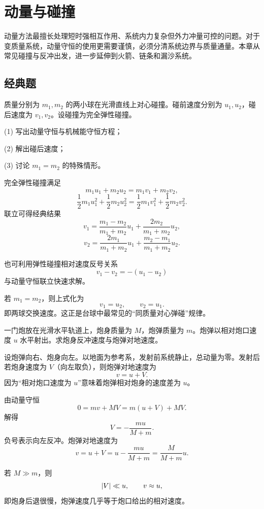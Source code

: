 \chapter{动量与碰撞}

动量方法最擅长处理短时强相互作用、系统内力复杂但外力冲量可控的问题。对于变质量系统，动量守恒的使用更需要谨慎，必须分清系统边界与质量通量。本章从常见碰撞与反冲出发，进一步延伸到火箭、链条和漏沙系统。

\section*{经典题}

\begin{classic}
质量分别为 $m_1,m_2$ 的两小球在光滑直线上对心碰撞。碰前速度分别为 $u_1,u_2$，碰后速度为 $v_1,v_2$。设碰撞为完全弹性碰撞。

(1) 写出动量守恒与机械能守恒方程；

(2) 解出碰后速度；

(3) 讨论 $m_1=m_2$ 的特殊情形。

\begin{solution}
完全弹性碰撞满足
\[
m_1u_1+m_2u_2=m_1v_1+m_2v_2,
\]
\[
\frac12 m_1u_1^2+\frac12 m_2u_2^2=\frac12 m_1v_1^2+\frac12 m_2v_2^2.
\]
联立可得经典结果
\[
v_1=\frac{m_1-m_2}{m_1+m_2}u_1+\frac{2m_2}{m_1+m_2}u_2,
\]
\[
v_2=\frac{2m_1}{m_1+m_2}u_1+\frac{m_2-m_1}{m_1+m_2}u_2.
\]

也可利用弹性碰撞相对速度反号关系
\[
v_1-v_2=-(u_1-u_2)
\]
与动量守恒联立快速求解。

若 $m_1=m_2$，则上式化为
\[
v_1=u_2,
\qquad
v_2=u_1.
\]
即两球交换速度。这正是台球中最常见的“同质量对心弹碰”规律。
\end{solution}
\end{classic}

\begin{classic}
一门炮放在光滑水平轨道上，炮身质量为 $M$，炮弹质量为 $m$。炮弹以相对炮口速度 $u$ 水平射出。求炮身反冲速度与炮弹对地速度。

\begin{solution}
设炮弹向右、炮身向左。以地面为参考系，发射前系统静止，总动量为零。发射后若炮身速度为 $V$（向左取负），则炮弹对地速度为
\[
v=u+V.
\]
因为“相对炮口速度为 $u$”意味着炮弹相对炮身的速度差为 $u$。

由动量守恒
\[
0=mv+MV=m(u+V)+MV.
\]
解得
\[
V=-\frac{mu}{M+m}.
\]
负号表示向左反冲。炮弹对地速度为
\[
v=u+V=u-\frac{mu}{M+m}=\frac{M}{M+m}u.
\]

若 $M\gg m$，则
\[
\abs{V}\ll u,
\qquad v\approx u,
\]
即炮身后退很慢，炮弹速度几乎等于炮口给出的相对速度。
\end{solution}
\end{classic}

